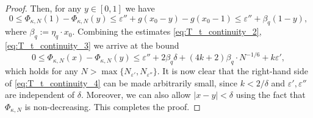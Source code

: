 \documentclass[10pt,a4paper]{amsart}
\begin{document}
\begin{proof}
    Then, for any $y\in[0,1]$ we have
    \begin{equation}\label{eq:T_t_continuity_3}
        0\le \Phi_{\kappa,N}(1)- \Phi_{\kappa,N}(y) \le \varepsilon'' + g(x_0-y)-g(x_0-1)  \le \varepsilon'' + \beta_q(1-y),
    \end{equation}
    where $\beta_q:=\eta_q\cdot x_0$. Combining the estimates \eqref{eq:T_t_continuity_2}, \eqref{eq:T_t_continuity_3} we arrive at the bound
    \begin{equation} \label{eq:T_t_continuity_4}
       0\le \Phi_{\kappa,N}(x)-\Phi_{\kappa,N}(y) \le \varepsilon'' + 2\beta_q\delta+(4k+2)\beta_q\cdot N^{-1/6} + k \varepsilon',
    \end{equation}
    which holds for any $N>\max\{ N_{\varepsilon'}, N_{\varepsilon''} \}$. It is now clear that the right-hand side of \eqref{eq:T_t_continuity_4} can be made arbitrarily small, since $k<2/\delta$ and $\varepsilon', \varepsilon''$ are independent of $\delta$. Moreover, we can also allow $|x-y|<\delta$ using the fact that $\Phi_{\kappa,N}$ is non-decreasing. This completes the proof. 
\end{proof}
\end{document}
